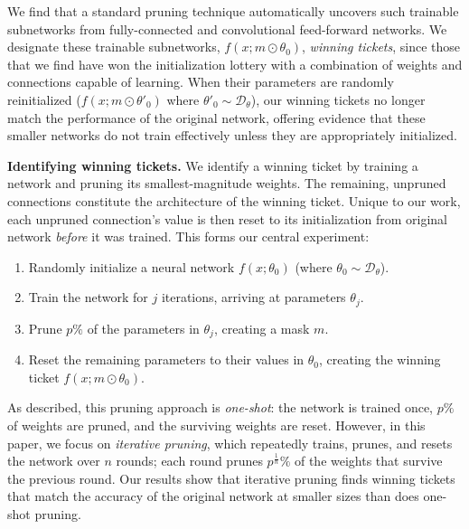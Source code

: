 We find that a standard pruning technique automatically uncovers such trainable subnetworks
from fully-connected and convolutional feed-forward networks.
We designate these trainable subnetworks, $f(x; m \odot \theta_0)$, \emph{winning tickets}, since those that we find have won the initialization lottery
with a combination of weights and connections capable of learning.
When their parameters
are randomly reinitialized ($f(x; m \odot \theta'_0)$ where $\theta'_0 \sim \mathcal{D}_\theta$), our winning tickets no longer match the performance
of the original network, offering evidence that these smaller networks do not train effectively unless they are appropriately initialized.

\textbf{Identifying winning tickets.} We
identify a winning ticket by training a network and pruning its smallest-magnitude weights.
The remaining, unpruned connections constitute
the architecture of the winning ticket. Unique to our work, each unpruned connection's value is then reset to
its initialization from original network \emph{before} it was trained.
This forms our central experiment:%
\vspace{-.5em}
\begin{enumerate}
\item Randomly initialize a neural network $f(x; \theta_0)$ (where $\theta_0 \sim \mathcal{D}_\theta$).
\item Train the network for $j$ iterations, arriving at parameters $\theta_j$.%
\item Prune $p\%$ of the parameters in $\theta_j$, creating a mask $m$.
\item Reset the remaining parameters to their values in $\theta_0$, creating the winning ticket $f(x; m \odot \theta_0)$.
\end{enumerate}
\vspace{-.5em}

As described, this pruning approach is \emph{one-shot}: the network is trained
once, $p\%$ of weights are pruned, and the surviving weights are reset. However, in this paper, we focus on \emph{iterative pruning}, which repeatedly
trains, prunes, and resets the network over $n$ rounds; each round prunes $p^{\frac{1}{n}}\%$ of the weights that survive the previous round.
Our results show that iterative pruning finds winning tickets that match the accuracy of the original network at smaller sizes than does one-shot pruning.

